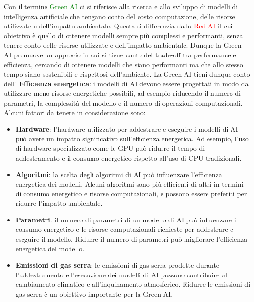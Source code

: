 \noindent Con il termine \textcolor{green}{Green AI} \cite{GreenAI} ci si riferisce alla ricerca e allo sviluppo di modelli di intelligenza artificiale che tengano conto del costo computazione, delle risorse utilizzate e dell'impatto ambientale. Questa si differenzia dalla \textcolor{red}{Red AI} il cui obiettivo è quello di ottenere modelli sempre più complessi e performanti, senza tenere conto delle risorse utilizzate e dell'impatto ambientale. Dunque la Green AI promuove un approcio in cui si tiene conto del trade-off tra performance e efficienza, cercando di ottenere modelli che siano performanti ma che allo stesso tempo siano sostenibili e rispettosi dell'ambiente.
La Green AI tieni dunque conto dell' \textbf{Efficienza energetica}: i modelli di AI devono essere progettati in modo da utilizzare meno risorse energetiche possibili, ad esempio riducendo il numero di parametri, la complessità del modello e il numero di operazioni computazionali.
Alcuni fattori da tenere in considerazione sono:
\begin{itemize}
    \item \textbf{Hardware}: l'hardware utilizzato per addestrare e eseguire i modelli di AI può avere un impatto significativo sull'efficienza energetica. Ad esempio, l'uso di hardware specializzato come le GPU può ridurre il tempo di addestramento e il consumo energetico rispetto all'uso di CPU tradizionali.
    \item \textbf{Algoritmi}: la scelta degli algoritmi di AI può influenzare l'efficienza energetica dei modelli. Alcuni algoritmi sono più efficienti di altri in termini di consumo energetico e risorse computazionali, e possono essere preferiti per ridurre l'impatto ambientale.
    \item \textbf{Parametri}: il numero di parametri di un modello di AI può influenzare il consumo energetico e le risorse computazionali richieste per addestrare e eseguire il modello. Ridurre il numero di parametri può migliorare l'efficienza energetica del modello.
    \item \textbf{Emissioni di gas serra}: le emissioni di gas serra prodotte durante l'addestramento e l'esecuzione dei modelli di AI possono contribuire al cambiamento climatico e all'inquinamento atmosferico. Ridurre le emissioni di gas serra è un obiettivo importante per la Green AI.
\end{itemize}


